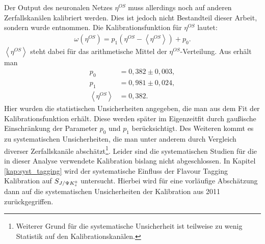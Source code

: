Der Output des neuronalen Netzes $\eta^{OS}$ muss allerdings noch auf anderen Zerfallskanälen kalibriert werden. Dies ist jedoch nicht Bestandteil dieser Arbeit, sondern wurde \cite{tagging} entnommen. Die Kalibrationsfunktion für $\eta^{OS}$ lautet:
\begin{align}
\omega(\eta^{OS}) = p_1\left(\eta^{OS}-\left\langle \eta^{OS} \right\rangle\right) + p_0 .
\end{align}
$\left\langle \eta^{OS} \right\rangle$ steht dabei für das arithmetische Mittel der $\eta^{OS}$-Verteilung. Aus \cite{tagging} erhält man
\begin{align}
p_0 &= 0,382 \pm 0,003, \\
p_1 &= 0,981 \pm 0,024, \\
\left\langle \eta^{OS} \right\rangle &= 0,382.
\end{align}
Hier wurden die statistischen Unsicherheiten angegeben, die man aus dem Fit der Kalibrationsfunktion erhält. Diese werden später im Eigenzeitfit durch gaußische Einschränkung der Parameter $p_0$ und $p_1$ berücksichtigt. Des Weiteren kommt es zu systematischen Unsicherheiten, die man unter anderem durch Vergleich diverser Zerfallskanäle abschätzt\footnote{Weiterer Grund für die systematische Unsicherheit ist teilweise zu wenig Statistik auf den Kalibrationskanälen.}. Leider sind die systematischen Studien für die in dieser Analyse verwendete Kalibration bislang nicht abgeschlossen. In Kapitel \ref{kap:syst_tagging} wird der systematische Einfluss der Flavour Tagging Kalibration auf  $S_{J/\Psi K_s^0}$ untersucht. Hierbei wird für eine vorläufige Abschätzung dann auf die systematischen Unsicherheiten der Kalibration aus 2011 \cite{lhcb-paper} zurückgegriffen.

